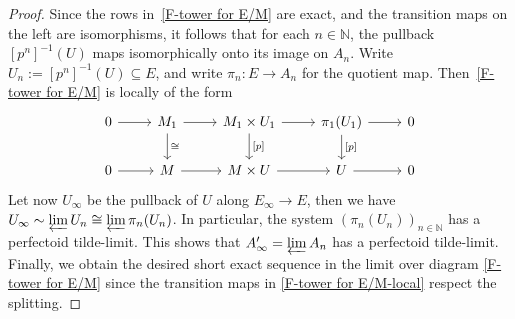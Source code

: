 \documentclass[10pt,oneside]{amsart}
\theoremstyle{definition}
\begin{document}
		\begin{proof}
			Since the rows in~\eqref{F-tower for E/M} are exact, and the transition maps on the left are isomorphisms, it follows that for each $n\in \mathbb{N}$, the pullback $[p^n]^{-1}(U)$ maps isomorphically onto its image on $A_n$. Write $U_n:=[p^n]^{-1}(U)\subseteq E$, and write $\pi_n:E\to A_n$ for the quotient map. Then~\eqref{F-tower for E/M} is locally of the form
				\begin{equation}\label{F-tower for E/M-local}
				\begin{tikzcd}
				0 \arrow[r] & M_1\arrow[d, "\cong"] \arrow[r] &  M_1\times U_1 \arrow[d, "{[p]}"] \arrow[r] &\pi_1(U_1) \arrow[d, "{[p]}"] \arrow[r] & 0 \\
				0 \arrow[r] & M \arrow[r] & M\times U \arrow[r] & U \arrow[r] & 0
				\end{tikzcd}
				\end{equation}
			Let now $U_\infty$ be the pullback of $U$ along $E_\infty\to E$, then we have $U_\infty\sim \varprojlim U_n\cong \varprojlim \pi_n(U_n)$. In particular, the system $(\pi_n(U_n))_{n\in \mathbb{N}}$ has a perfectoid tilde-limit. This shows that $A'_\infty=\varprojlim A_n$ has a perfectoid tilde-limit. 
			Finally, we obtain the desired short exact sequence in the limit over diagram \eqref{F-tower for E/M} since the transition maps in \eqref{F-tower for E/M-local} respect the splitting.
		\end{proof}
	
\end{document}
